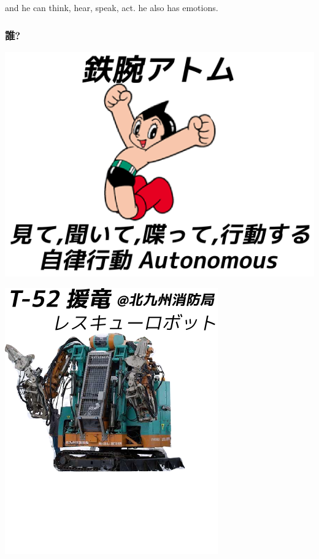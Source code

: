 \begin{resume}
and he can think, hear, speak, act. he also has emotions.
\end{resume}

\subsubsection{誰?}
\label{sec-4-1-3}

\begin{container-fluid}
\begin{row-fluid}
\begin{span6}
\includegraphics{img/astro/final.png}
\end{span6}
\begin{span6}
\includegraphics{img/rescue/2.png}
\end{span6}
\end{row-fluid}
\end{container-fluid}

